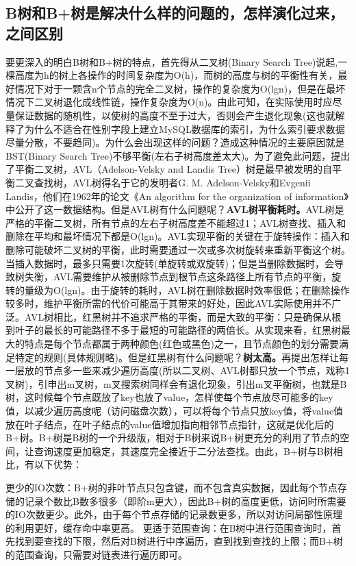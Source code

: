 \documentclass[../../../interview-questions.tex]{subfiles}
\begin{document}
\subsection{B树和B+树是解决什么样的问题的，怎样演化过来，之间区别}

要更深入的明白B树和B+树的特点，首先得从二叉树(Binary Search Tree)说起,一棵高度为h的树上各操作的时间复杂度为O(h)，而树的高度与树的平衡性有关，最好情况下对于一颗含n个节点的完全二叉树，操作的复杂度为O(lgn)，但是在最坏情况下二叉树退化成线性链，操作复杂度为O(n)。由此可知，在实际使用时应尽量保证数据的随机性，以使树的高度不至于过大，否则会产生退化现象(这也就解释了为什么不适合在性别字段上建立MySQL数据库的索引，为什么索引要求数据尽量分散，不要趋同)。为什么会出现这样的问题？造成这种情况的主要原因就是BST(Binary Search Tree)不够平衡(左右子树高度差太大)。为了避免此问题，提出了平衡二叉树，AVL（Adelson-Velsky and Landis Tree）树是最早被发明的自平衡二叉查找树，AVL树得名于它的发明者G. M. Adelson-Velsky和Evgenii Landis，他们在1962年的论文《An algorithm for the organization of information》中公开了这一数据结构。但是AVL树有什么问题呢？\textbf{AVL树平衡耗时。}AVL树是严格的平衡二叉树，所有节点的左右子树高度差不能超过1；AVL树查找、插入和删除在平均和最坏情况下都是O(lgn)。AVL实现平衡的关键在于旋转操作：插入和删除可能破坏二叉树的平衡，此时需要通过一次或多次树旋转来重新平衡这个树。当插入数据时，最多只需要1次旋转(单旋转或双旋转)；但是当删除数据时，会导致树失衡，AVL需要维护从被删除节点到根节点这条路径上所有节点的平衡，旋转的量级为O(lgn)。由于旋转的耗时，AVL树在删除数据时效率很低；在删除操作较多时，维护平衡所需的代价可能高于其带来的好处，因此AVL实际使用并不广泛。AVL树相比，红黑树并不追求严格的平衡，而是大致的平衡：只是确保从根到叶子的最长的可能路径不多于最短的可能路径的两倍长。从实现来看，红黑树最大的特点是每个节点都属于两种颜色(红色或黑色)之一，且节点颜色的划分需要满足特定的规则(具体规则略)。但是红黑树有什么问题呢？\textbf{树太高。}再提出怎样让每一层放的节点多一些来减少遍历高度(所以二叉树、AVL树都只放一个节点，戏称1叉树)，引申出m叉树，m叉搜索树同样会有退化现象，引出m叉平衡树，也就是B树，这时候每个节点既放了key也放了value，怎样使每个节点放尽可能多的key值，以减少遍历高度呢（访问磁盘次数），可以将每个节点只放key值，将value值放在叶子结点，在叶子结点的value值增加指向相邻节点指针，这就是优化后的B+树。B+树是B树的一个升级版，相对于B树来说B+树更充分的利用了节点的空间，让查询速度更加稳定，其速度完全接近于二分法查找。由此，B+树与B树相比，有以下优势：

更少的IO次数：B+树的非叶节点只包含键，而不包含真实数据，因此每个节点存储的记录个数比B数多很多（即阶m更大），因此B+树的高度更低，访问时所需要的IO次数更少。此外，由于每个节点存储的记录数更多，所以对访问局部性原理的利用更好，缓存命中率更高。
更适于范围查询：在B树中进行范围查询时，首先找到要查找的下限，然后对B树进行中序遍历，直到找到查找的上限；而B+树的范围查询，只需要对链表进行遍历即可。
\end{document}
